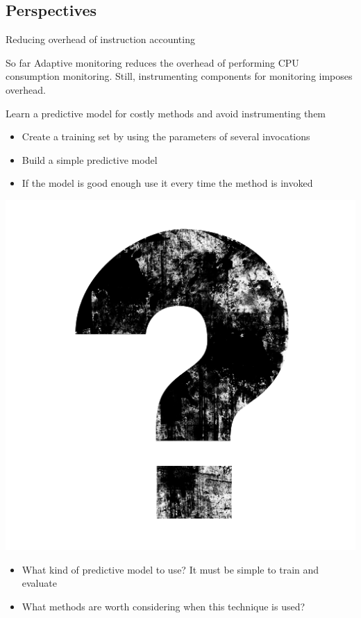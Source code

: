 \documentclass[10pt,xcolor={dvipsnames}]{beamer}
\begin{document}
	\subsection{Perspectives}
	
	\begin{frame}{Reducing overhead of instruction accounting}
		\begin{block}{So far}
			Adaptive monitoring reduces the overhead of performing CPU consumption monitoring. Still, instrumenting components for monitoring imposes overhead.
		\end{block}
		
		\begin{alertblock}{ Learn a predictive model for costly methods and avoid instrumenting them }
			\begin{itemize}
				\item Create a training set by using the parameters of several invocations
				\item Build a simple predictive model
				\item If the model is good enough use it every time the method is invoked 
			\end{itemize}
		\end{alertblock}
		
		\begin{alertblock}{\centering \includegraphics[scale=0.03]{fig/questions.png}}
			\begin{itemize}
				\item What kind of predictive model to use? It must be simple to train and evaluate
				\item What methods are worth considering when this technique is used?
			\end{itemize}
		\end{alertblock}
	\end{frame}
	
\end{document}
